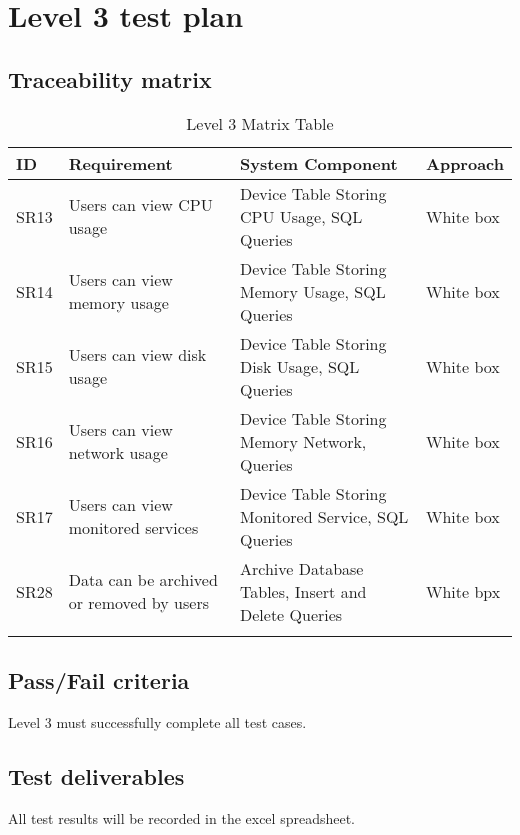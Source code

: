 \documentclass[letterpaper,12pt,oneside,listof=totoc]{scrreprt}
\begin{document}
\section{Level 3 test plan}

\subsection{Traceability matrix}
\begin{longtable}{ p{} |  p{} | p{}  | p{}}
\hline
\textbf{ID} & \textbf{Requirement} & \textbf{System Component}&\textbf{Approach} \\
\hline
SR13 & Users can view CPU usage & Device Table Storing CPU Usage, SQL Queries&White box\\
\hline
SR14 & Users can view memory usage & Device Table Storing Memory Usage, SQL Queries&White box\\
\hline
SR15 & Users can view disk usage & Device Table Storing Disk Usage, SQL Queries&White box\\
\hline
SR16 & Users can view network usage & Device Table Storing Memory Network, Queries&White box\\
\hline
SR17 & Users can view monitored services & Device Table Storing Monitored Service, SQL Queries&White box\\
\hline
SR28 & Data can be archived or removed by users & Archive Database Tables, Insert and Delete Queries&White bpx\\
\hline
\caption{Level 3 Matrix Table}
\label{Level 3 Matrix Table}
\end{longtable}


\subsection{Pass/Fail criteria}
Level 3 must successfully complete all test cases.
\subsection{Test deliverables}
All test results will be recorded in the excel spreadsheet.

\end{document}

